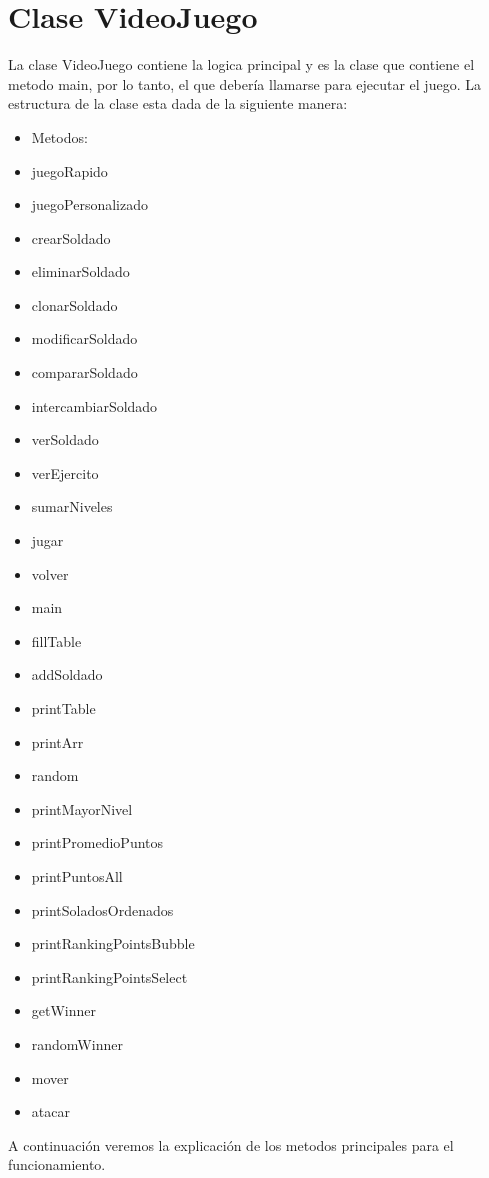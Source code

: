 \section{Clase VideoJuego}
La clase VideoJuego contiene la logica principal y es la clase que contiene el metodo main, por lo tanto, el que debería llamarse para ejecutar el juego. 
La estructura de la clase esta dada de la siguiente manera:

\begin{itemize}
  \item Metodos: 
	\item juegoRapido
	\item juegoPersonalizado
	\item crearSoldado
	\item eliminarSoldado
	\item clonarSoldado
	\item modificarSoldado
	\item compararSoldado
	\item intercambiarSoldado
	\item verSoldado
	\item verEjercito
	\item sumarNiveles
	\item jugar
	\item volver
	\item main
	\item fillTable
	\item addSoldado
	\item printTable
	\item printArr
	\item random
	\item printMayorNivel
	\item printPromedioPuntos
	\item printPuntosAll
	\item printSoladosOrdenados
	\item printRankingPointsBubble
	\item printRankingPointsSelect
	\item getWinner
	\item randomWinner
	\item mover
	\item atacar
\end{itemize}
A continuación veremos la explicación de los metodos principales para el funcionamiento.
